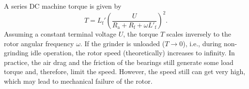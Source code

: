 
\begin{solutionblock}
  A series DC machine torque is given by
  \begin{equation}
    T = L_{\mathrm{f}}' \left(\frac{U}{R_\mathrm{a} + R_\mathrm{f} + \omega L'_\mathrm{f}}\right)^2.
  \end{equation}
  Assuming a constant terminal voltage $U$, the torque $T$ scales inversely to the rotor angular frequency $\omega$. If the grinder is unloaded ($T \rightarrow 0$), i.e., during non-grinding idle operation, the rotor speed (theoretically) increases to infinity.  In practice, the air drag and the friction of the bearings still generate some load torque and, therefore, limit the speed. However, the speed still can get very high, which may lead to mechanical failure of the rotor.
\end{solutionblock}


